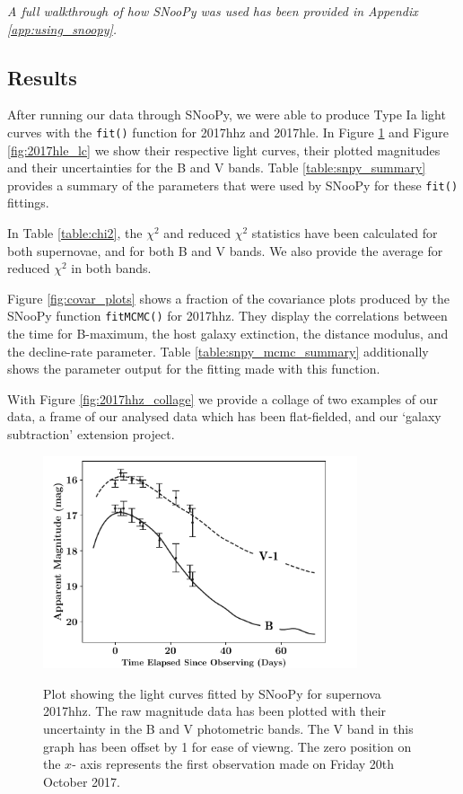 \documentclass[twocolumn]{revtex4}
\begin{document}
\textit{A full walkthrough of how SNooPy was used has been provided in Appendix \ref{app:using_snoopy}.}

\vspace{-3ex}
\subsection{Results}
\vspace{-2ex}
After running our data through SNooPy, we were able to produce Type Ia light curves with the \texttt{fit()} function for 2017hhz and 2017hle. In Figure \ref{fig:2017hhz_lc} and Figure \ref{fig:2017hle_lc} we show their respective light curves, their plotted magnitudes and their uncertainties for the B and V bands. Table \ref{table:snpy_summary} provides a summary of the parameters that were used by SNooPy for these \texttt{fit()} fittings.

In Table \ref{table:chi2}, the $\chi^2$ and reduced $\chi^2$ statistics have been calculated for both supernovae, and for both B and V bands. We also provide the average for reduced $\chi^2$ in both bands. 

Figure \ref{fig:covar_plots} shows a fraction of the covariance plots produced by the SNooPy function \texttt{fitMCMC()} for 2017hhz. They display the correlations between the time for B-maximum, the host galaxy extinction, the distance modulus, and the decline-rate parameter. Table \ref{table:snpy_mcmc_summary} additionally shows the parameter output for the fitting made with this function.

With Figure \ref{fig:2017hhz_collage} we provide a collage of two examples of our data, a frame of our analysed data which has been flat-fielded, and our `galaxy subtraction' extension project.

\begin{figure}[!h]
\begin{center}
\includegraphics[width=9.25cm]{results/2017hhz}
\caption[]{Plot showing the light curves fitted by SNooPy for supernova 2017hhz. The raw magnitude data has been plotted with their uncertainty in the B and V photometric bands. The V band in this graph has been offset by 1 for ease of viewng. The zero position on the $x$- axis represents the first observation made on Friday 20th October 2017.}
\vspace{-1.5em}
\label{fig:2017hhz_lc}
\end{center}
\end{figure}
\end{document}
